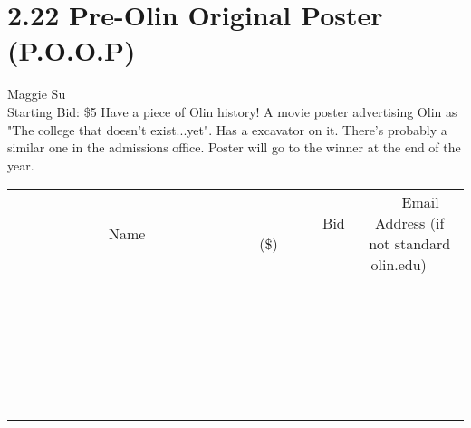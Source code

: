 \documentclass[11pt]{article}
\begin{document}
\section*{2.22 Pre-Olin Original Poster (P.O.O.P)}
Maggie Su
\\
Starting Bid: \$5
\newline
Have a piece of Olin history! A movie poster advertising Olin as "The college that doesn't exist...yet". Has a excavator on it. There's probably a similar one in the admissions office. Poster will go to the winner at the end of the year.
\\[6ex]
\begin{tabular}{c c c}
~~~~~~~~~~~~~Name~~~~~~~~~~~~~ & ~~~~~~~~~Bid (\$)~~~~~~~~~  & ~~~Email Address (if not standard olin.edu)~~~\\
 & & \\
\hline
 & & \\
\hline
 & & \\
\hline
 & & \\
\hline
 & & \\
\hline
 & & \\
\hline
 & & \\
\hline
 & & \\
\hline
 & & \\
\hline
 & & \\
\hline
 & & \\
\hline
 & & \\
\hline
 & & \\
\hline
 & & \\
\hline
 & & \\
\hline
 & & \\
\hline
 & & \\
\hline
 & & \\
\hline
 & & \\
\hline
 & & \\
\hline
 & & \\
\hline
 & & \\
\hline
 & & \\
\hline
 & & \\
\hline
 & & \\
\hline
 & & \\
\hline
\end{tabular}
\newpage
\end{document}
